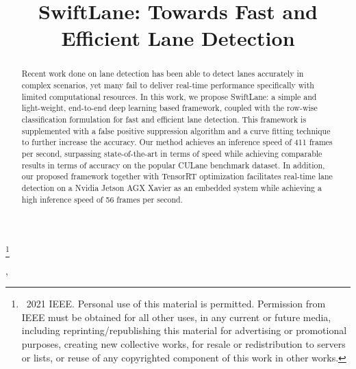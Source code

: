 \documentclass[conference]{IEEEtran}
\newcommand\blfootnote[1]{\begingroup
  \renewcommand\thefootnote{}\footnote{#1}\addtocounter{footnote}{-1}\endgroup
}
\begin{document}
\title{SwiftLane: Towards Fast and Efficient Lane Detection\\

}



\author{
}

\maketitle
\thispagestyle{plain}
\pagestyle{plain}

\def\footnoterule{\relax \kern-5pt
  \hbox to \columnwidth{\vrule width .4\columnwidth height 0.4pt\hfill}
  \kern4.6pt}
\makeatother

\begin{abstract}
Recent work done on lane detection has been able to detect lanes accurately in complex scenarios, yet many fail to deliver real-time performance specifically with limited computational resources. In this work, we propose SwiftLane: a simple and light-weight, end-to-end deep learning based framework, coupled with the row-wise classification formulation for fast and efficient lane detection. This framework is supplemented with a false positive suppression algorithm and a curve fitting technique to further increase the accuracy. Our method achieves an inference speed of 411 frames per second, surpassing state-of-the-art in terms of speed while achieving comparable results in terms of accuracy on the popular CULane benchmark dataset. In addition, our proposed framework together with TensorRT optimization facilitates real-time lane detection on a Nvidia Jetson AGX Xavier as an embedded system while achieving a high inference speed of 56 frames per second. 
\end{abstract}

\blfootnote{\textcopyright \ 2021 IEEE. Personal use of this material is permitted.
  Permission from IEEE must be obtained for all other uses, in any current or future 
  media, including reprinting/republishing this material for advertising or promotional 
  purposes, creating new collective works, for resale or redistribution to servers or 
  lists, or reuse of any copyrighted component of this work in other works.},
 
\end{document}
